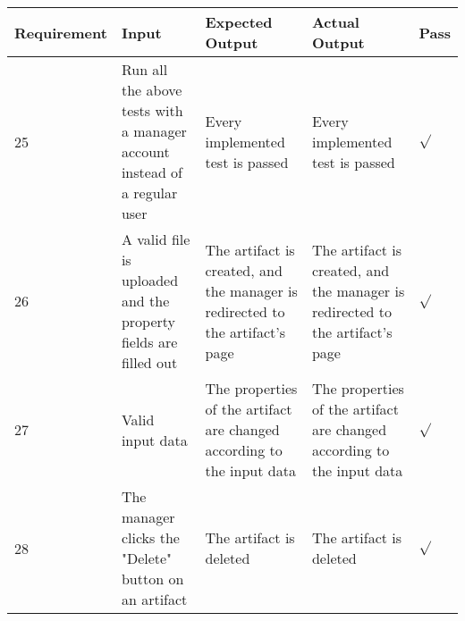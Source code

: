 {\centering
\scalebox{0.7}
{\begin{tabular}{ | p{2cm} | p{3cm} | p{4cm} | p{4cm} | p{0.5cm} | }
	\hline
	\textbf{Requirement} & \textbf{Input} & \textbf{Expected Output} & \textbf{Actual Output} & \textbf{Pass} \\
	\hline
	25 & Run all the above tests with a manager account instead of a regular user & Every implemented test is passed & Every implemented test is passed & $\sqrt{}$ \\
	\hline
	26 & A valid file is uploaded and the property fields are filled out & The artifact is created, and the manager is redirected to the artifact's page & The artifact is created, and the manager is redirected to the artifact's page & $\sqrt{}$ \\
	\hline
	27 & Valid input data & The properties of the artifact are changed according to the input data & The properties of the artifact are changed according to the input data & $\sqrt{}$ \\
	\hline
	28 & The manager clicks the "Delete" button on an artifact & The artifact is deleted & The artifact is deleted & $\sqrt{}$ \\
	\hline
\end{tabular}}}
